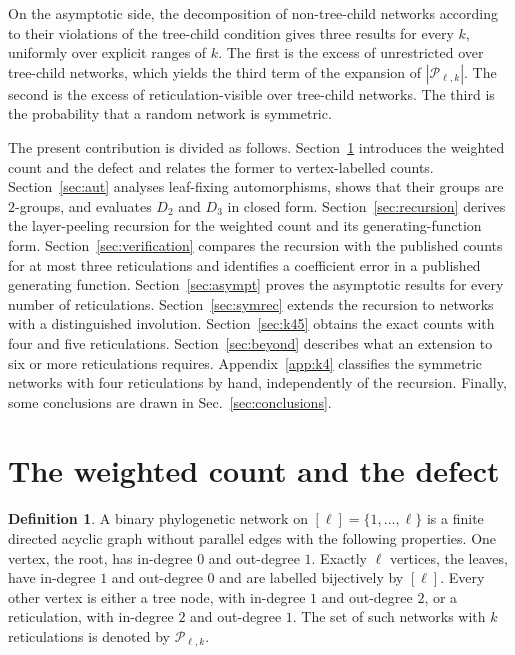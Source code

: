 \documentclass[11pt,a4paper]{article}
\theoremstyle{definition}
\newtheorem{definition}[theorem]{Definition}
\newcommand{\cP}{\mathcal{P}}
\begin{document}
On the asymptotic side, the decomposition of non-tree-child networks according to their violations of the tree-child condition gives three results for every $k$, uniformly over explicit ranges of $k$. The first is the excess of unrestricted over tree-child networks, which yields the third term of the expansion of $|\cP_{\ell,k}|$. The second is the excess of reticulation-visible over tree-child networks. The third is the probability that a random network is symmetric.

The present contribution is divided as follows. Section~\ref{sec:weighted} introduces the weighted count and the defect and relates the former to vertex-labelled counts. Section~\ref{sec:aut} analyses leaf-fixing automorphisms, shows that their groups are $2$-groups, and evaluates $D_2$ and $D_3$ in closed form. Section~\ref{sec:recursion} derives the layer-peeling recursion for the weighted count and its generating-function form. Section~\ref{sec:verification} compares the recursion with the published counts for at most three reticulations and identifies a coefficient error in a published generating function. Section~\ref{sec:asympt} proves the asymptotic results for every number of reticulations. Section~\ref{sec:symrec} extends the recursion to networks with a distinguished involution. Section~\ref{sec:k45} obtains the exact counts with four and five reticulations. Section~\ref{sec:beyond} describes what an extension to six or more reticulations requires. Appendix~\ref{app:k4} classifies the symmetric networks with four reticulations by hand, independently of the recursion. Finally, some conclusions are drawn in Sec.~\ref{sec:conclusions}.


\section{The weighted count and the defect}\label{sec:weighted}

\begin{definition}\label{def:network}
A binary phylogenetic network on $[\ell]=\{1,\dots,\ell\}$ is a finite directed acyclic graph without parallel edges with the following properties. One vertex, the root, has in-degree $0$ and out-degree $1$. Exactly $\ell$ vertices, the leaves, have in-degree $1$ and out-degree $0$ and are labelled bijectively by $[\ell]$. Every other vertex is either a tree node, with in-degree $1$ and out-degree $2$, or a reticulation, with in-degree $2$ and out-degree $1$. The set of such networks with $k$ reticulations is denoted by $\cP_{\ell,k}$.
\end{definition}
\end{document}
